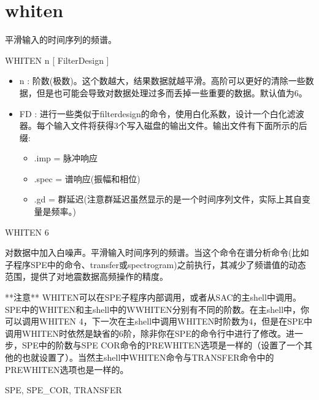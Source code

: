 \section{whiten}
\label{cmd:whiten}

平滑输入的时间序列的频谱。

WHITEN n [ FilterDesign ]

\begin{itemize}
\item n :  阶数(极数)。这个数越大，结果数据就越平滑。高阶可以更好的清除一些数据，但是也可能会导致对数据处理过多而丢掉一些重要的数据。默认值为6。 
\item FD : 进行一些类似于filterdesign的命令，使用白化系数，设计一个白化滤波器。每个输入文件将获得3个写入磁盘的输出文件。输出文件有下面所示的后缀:  
	\begin{itemize}
	\item .imp = 脉冲响应
	\item .spec = 谱响应(振幅和相位)
	\item .gd = 群延迟(注意群延迟虽然显示的是一个时间序列文件，实际上其自变量是频率。)
	\end{itemize}
\end{itemize}

WHITEN 6

对数据中加入白噪声。平滑输入时间序列的频谱。当这个命令在谱分析命令(比如子程序SPE中的命令、transfer或spectrogram)之前执行，其减少了频谱值的动态范围，提供了对地震数据高频操作的精度。

**注意**  WHITEN可以在SPE子程序内部调用，或者从SAC的主shell中调用。SPE中的WHITEN和主shell中的WWHITEN分别有不同的阶数。在主shell中，你可以调用WHITEN 4，下一次在主shell中调用WHITEN时阶数为4，但是在SPE中调用WHITEN时依然是缺省的6阶，除非你在SPE的命令行中进行了修改。进一步，SPE中的阶数与SPE COR命令的PREWHITEN选项是一样的（设置了一个其他的也就设置了）。当然主shell中WHITEN命令与TRANSFER命令中的PREWHITEN选项也是一样的。

SPE, SPE\_COR, TRANSFER


